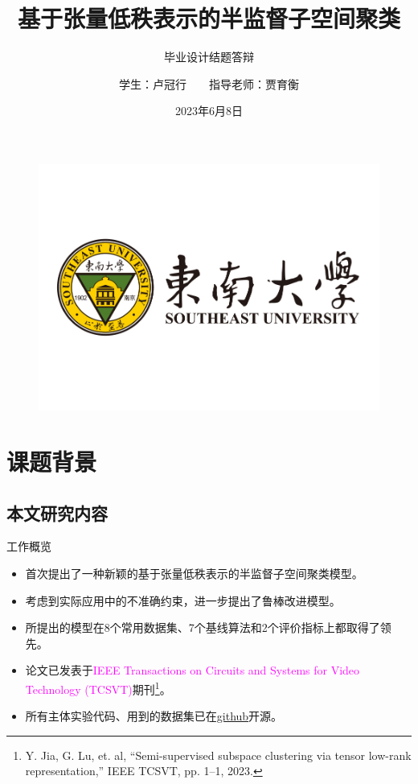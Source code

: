 \documentclass{beamer}
\author{学生：卢冠行~~~~指导老师：贾育衡}
\title{基于张量低秩表示的半监督子空间聚类}
\subtitle{毕业设计结题答辩}
\institute{东南大学吴健雄学院}
\date{2023年6月8日}
\begin{document}
\kaishu
\begin{frame}
    \titlepage
    \begin{figure}[htpb]
        \begin{center}
            \includegraphics[width=0.25\linewidth]{pic/CLTlogo.jpg}
        \end{center}
    \end{figure}
\end{frame}

\begin{frame}
    \tableofcontents[sectionstyle=show,subsectionstyle=show/shaded/hide,subsubsectionstyle=show/shaded/hide]
\end{frame}


\section{课题背景}

\subsection{本文研究内容}

\begin{frame}{工作概览}

    \begin{itemize}
        \item 首次提出了一种新颖的基于张量低秩表示的半监督子空间聚类模型。
        \vspace{0.05cm}
        \item 考虑到实际应用中的不准确约束，进一步提出了鲁棒改进模型。
        \vspace{0.05cm}
        \item 所提出的模型在8个常用数据集、7个基线算法和2个评价指标上都取得了领先。
        \vspace{0.05cm}
        \item 论文已发表于\textcolor{magenta}{IEEE Transactions on Circuits and Systems for Video Technology (TCSVT)}期刊\footnote{\scriptsize\cite{10007868} Y. Jia, G. Lu, et. al, “Semi-supervised subspace clustering via tensor
low-rank representation,” IEEE TCSVT, pp. 1–1, 2023.}。
        \vspace{0.05cm}
        \item 所有主体实验代码、用到的数据集已在\href{https://github.com/GuanxingLu/Subspace-Clustering}{github}开源。
        
    \end{itemize}
\end{frame}
\end{document}

